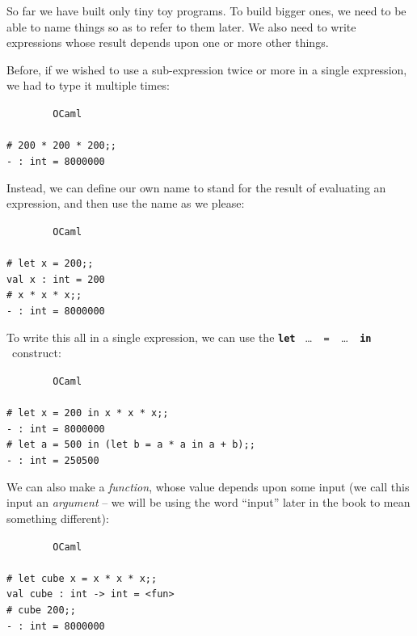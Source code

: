\documentclass[]{book}
\newcommand{\smspace}{\vspace{4mm}}
\begin{document}
So far we have built only tiny toy programs. To build bigger ones, we need to be able to name things so as to refer to them later. We also need to write expressions whose result depends upon one or more other things.

Before, if we wished to use a sub-expression twice or more in a single expression, we had to type it multiple times:

\smspace
\noindent\verb!        OCaml!\\
\noindent\\
\noindent\verb!# 200 * 200 * 200;;!\\
\noindent\verb!- : int = 8000000!
\smspace

\noindent Instead, we can define our own name to stand for the result of evaluating an expression, and then use the name as we please:

\smspace
\noindent\verb!        OCaml!\\
\noindent\\
\noindent\verb!# let x = 200;;!\\
\noindent\verb!val x : int = 200!\\
\noindent\verb!# x * x * x;;!\\
\noindent\verb!- : int = 8000000!
\smspace

\noindent To write this all in a single expression, we can use the \texttt{\textbf{let}} \ \ldots \ \ \texttt{=}\ \ \ldots \ \ \texttt{\textbf{in}} \ construct:

{\small
\smspace
\noindent\verb!        OCaml!\\
\noindent\\
\noindent\verb!# let x = 200 in x * x * x;;!\\
\noindent\verb!- : int = 8000000!\\
\noindent\verb!# let a = 500 in (let b = a * a in a + b);;!\\
\noindent\verb!- : int = 250500!
\smspace
}

\noindent We can also make a \textit{function}, whose value depends upon some input (we call this input an \textit{argument} -- we will be using the word ``input'' later in the book to mean something different):

\smspace
\noindent\verb!        OCaml!\\
\noindent\\
\noindent\verb!# let cube x = x * x * x;;!\\
\noindent\verb!val cube : int -> int = <fun>!\\
\noindent\verb!# cube 200;;!\\
\noindent\verb!- : int = 8000000!
\smspace
\end{document}
